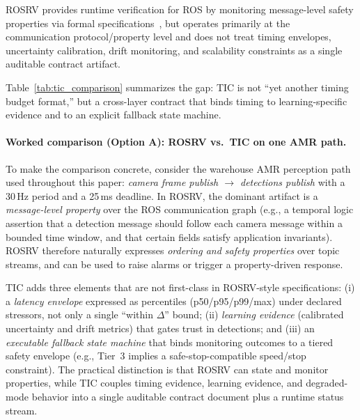 \documentclass[smallextended]{svjour3}
\begin{document}
{ROSRV} provides runtime verification for {ROS} by monitoring message-level safety properties via formal specifications~\cite{huang2014rosrv}, but operates primarily at the communication protocol/property level and does not treat timing envelopes, uncertainty calibration, drift monitoring, and scalability constraints as a single auditable contract artifact.

Table~\ref{tab:tic_comparison} summarizes the gap: TIC is not ``yet another timing budget format,'' but a cross-layer contract that binds timing to learning-specific evidence and to an explicit fallback state machine.

\paragraph{Worked comparison (Option A): ROSRV vs.\ TIC on one AMR path.}
To make the comparison concrete, consider the warehouse AMR perception path used throughout this paper:
\emph{camera frame publish \(\rightarrow\) detections publish} with a 30\,Hz period and a 25\,ms deadline.
In ROSRV, the dominant artifact is a \emph{message-level property} over the ROS communication graph (e.g., a temporal logic assertion that a detection message should follow each camera message within a bounded time window, and that certain fields satisfy application invariants). ROSRV therefore naturally expresses \emph{ordering and safety properties} over topic streams, and can be used to raise alarms or trigger a property-driven response.

TIC adds three elements that are not first-class in ROSRV-style specifications: (i) a \emph{latency envelope} expressed as percentiles (p50/p95/p99/max) under declared stressors, not only a single ``within \(\Delta\)'' bound; (ii) \emph{learning evidence} (calibrated uncertainty and drift metrics) that gates trust in detections; and (iii) an \emph{executable fallback state machine} that binds monitoring outcomes to a tiered safety envelope (e.g., Tier~3 implies a safe-stop-compatible speed/stop constraint). The practical distinction is that ROSRV can state and monitor properties, while TIC couples timing evidence, learning evidence, and degraded-mode behavior into a single auditable contract document plus a runtime status stream.
\end{document}
